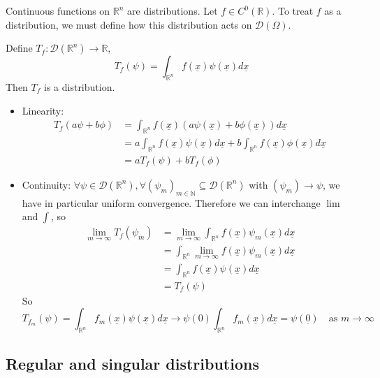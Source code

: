 \begin{example}
	Continuous functions on $\mathbb{R}^n$ are distributions. Let $f \in C^{0} (\mathbb{R})$. To treat $f$ as a distribution, we must define how this distribution acts on $\mathcal{D}(\Omega)$.
	
	Define $T_f: \mathcal{D}(\mathbb{R}^n) \rightarrow \mathbb{R}$,
	\[
		T_f (\psi) = \int_{\mathbb{R}^n} f(\underline{x}) \psi(\underline{x}) d \underline{x}
	\]
	Then $T_f$ is a distribution.
	\begin{itemize}
		\item Linearity:
		\[
			\begin{aligned}
				T_f (a \psi + b \phi)
					& = \int_{\mathbb{R}^n} f(\underline{x}) (a \psi(\underline{x}) + b \phi (\underline{x})) d \underline{x} \\
					& = a \int_{\mathbb{R}^n} f(\underline{x}) \psi(\underline{x}) d \underline{x} + b \int_{\mathbb{R}^n} f(\underline{x}) \phi(\underline{x}) d \underline{x} \\
					& = a T_f(\psi) + b T_f (\phi)
			\end{aligned}
		\]
		\item Continuity: $\forall \psi \in \mathcal{D}(\mathbb{R}^n), \forall {(\psi_m)}_{m \in \mathbb{N}} \subseteq \mathcal{D}(\mathbb{R}^n)$ with $(\psi_m) \rightarrow \psi$, we have in particular uniform convergence. Therefore we can interchange $\lim$ and $\int$, so
		\[
			\begin{aligned}
			\lim_{m \rightarrow \infty} T_f (\psi_m)
				& = \lim_{m \rightarrow \infty} \int_{\mathbb{R}^n} f(\underline{x}) \psi_m(\underline{x}) d\underline{x} \\
				& = \int_{\mathbb{R}^n} \lim_{m \rightarrow \infty} f(\underline{x}) \psi_m(\underline{x}) d\underline{x} \\
				& = \int_{\mathbb{R}^n} f(\underline{x}) \psi(\underline{x}) d\underline{x} \\
				& = T_f(\psi)
			\end{aligned}
		\]
		So
		\[
			T_{f_m} (\psi) = \int_{\mathbb{R}^n} f_m(\underline{x}) \psi(\underline{x}) d\underline{x} \rightarrow \psi(0) \int_{\mathbb{R}^n} f_m(\underline{x}) d\underline{x} = \psi(\underline{0}) \quad \text{as } m \rightarrow \infty
		\]
	\end{itemize}
\end{example}

\subsection{Regular and singular distributions}

